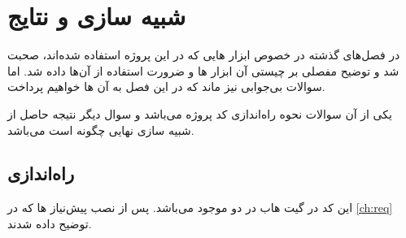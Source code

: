 \chapter{شبیه سازی و نتایج}
در فصل‌های گذشته در خصوص ابزار هایی که در این پروژه استفاده شده‌اند، صحبت شد و توضیح مفصلی بر چیستی آن ابزار ها و ضرورت استفاده از آن‌ها داده شد. اما سوالات بی‌جوابی نیز ماند که در این فصل به آن ها خواهیم پرداخت.

یکی از آن سوالات نحوه راه‌اندازی کد پروژه می‌باشد و سوال دیگر نتیجه حاصل از شبیه سازی نهایی چگونه است می‌باشد.
\section{راه‌اندازی}
این کد در گیت هاب در دو 
موجود می‌باشد. پس از نصب پیش‌نیاز ها که در 
\ref{ch:req}
توضیح داده شدند.
